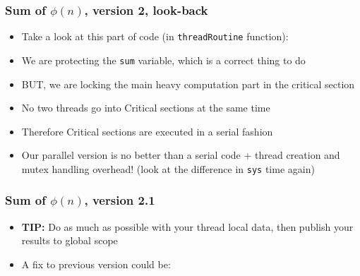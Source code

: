 \documentclass[aspectratio=43,11pt]{beamer}
\begin{document}
\begin{frame}
  \frametitle{Sum of $\phi(n)$, version 2, look-back}

  \begin{itemize}
    \item<1-> Take a look at this part of code (in {\tt threadRoutine} function):
    
    
    \item<2-> We are protecting the {\tt sum} variable, which is a correct thing to do
    \item<3-> BUT, we are locking the main heavy computation part in the critical section
    \item<4-> No two threads go into Critical sections at the same time
    \item<5-> Therefore Critical sections are executed in a serial fashion
    \item<6-> Our parallel version is no better than a serial code + thread creation and mutex handling overhead!
    (look at the difference in {\tt sys} time again)
  \end{itemize}
\end{frame}
\begin{frame}
  \frametitle{Sum of $\phi(n)$, version 2.1}
  
  \begin{itemize}
    \item \textbf{TIP:} Do as much as possible with your thread local data, then publish your results
    to global scope
    \item A fix to previous version could be:
    
  \end{itemize}
  \let\thefootnote\relax{}
\end{frame}
\end{document}
